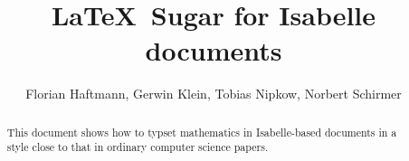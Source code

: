 \documentclass[11pt,a4paper]{article}
\begin{document}
\title{\LaTeX\ Sugar for Isabelle documents}
\author{Florian Haftmann, Gerwin Klein, Tobias Nipkow, Norbert Schirmer}
\maketitle

\begin{abstract}
This document shows how to typset mathematics in Isabelle-based
documents in a style close to that in ordinary computer science papers.
\end{abstract}






\end{document}
